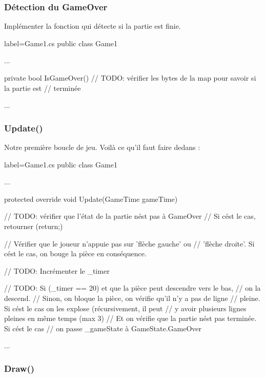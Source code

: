 \documentclass[a4paper]{article}
\begin{document}
\subsubsection{Détection du GameOver}

Implémenter la fonction qui détecte si la partie est finie. \\

\begin{csharpcode*}{label=Game1.cs}
public class Game1
{
    ...

    private bool IsGameOver()
    {
        // TODO: vérifier les bytes de la map pour savoir si la partie est
        //       terminée
    }
    
    ...
}
\end{csharpcode*}

\subsubsection{Update()}

Notre première boucle de jeu. Voilà ce qu'il faut faire dedans : \\

\begin{csharpcode*}{label=Game1.cs}
public class Game1
{
    ...

    protected override void Update(GameTime gameTime)
    {
        // TODO: vérifier que l'état de la partie nést pas à GameOver
        //       Si cést le cas, retourner (return;)

        // Vérifier que le joueur n'appuie pas sur 'flèche gauche' ou
        // 'flèche droite'. Si cést le cas, on bouge la pièce en conséquence.

        // TODO: Incrémenter le _timer

        // TODO: Si (_timer == 20) et que la pièce peut descendre vers le bas,
        //          on la descend.
        //       Sinon, on bloque la pièce, on vérifie qu'il n'y a pas de ligne
        //          pleine. Si cést le cas on les explose (récursivement, il peut
        //          y avoir plusieurs lignes pleines en même temps (max 3)
        //       Et on vérifie que la partie nést pas terminée. Si cést le cas
        //          on passe _gameState à GameState.GameOver
    }

    ...
}
\end{csharpcode*}

\subsubsection{Draw()}
\end{document}
